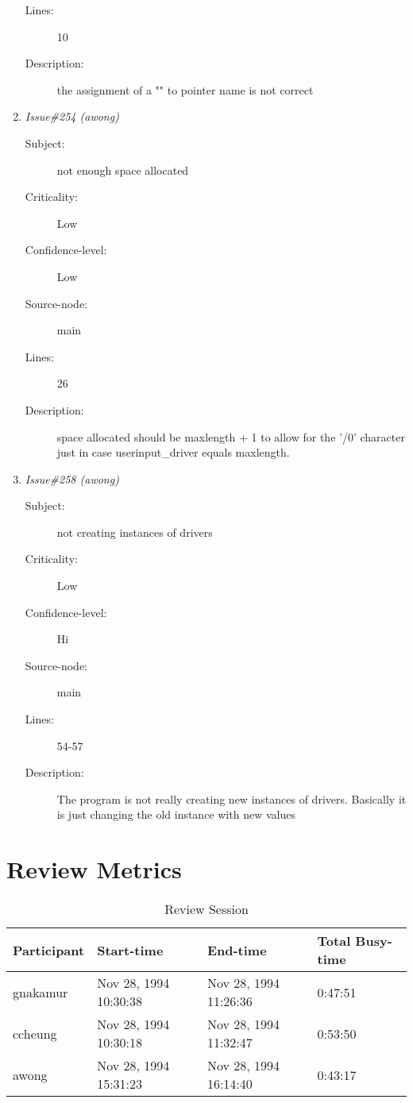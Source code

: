 \begin{enumerate}
\begin{description}
\item [Lines:] 10

\item [Description:] the assignment of a "" to pointer name is not correct
\end{description}
\item {\it Issue\#254 (awong)}
\begin{description}
\item [Subject:] not enough space allocated
\item [Criticality:] Low
\item [Confidence-level:] Low
\item [Source-node:] main

\item [Lines:] 26

\item [Description:] space allocated should be maxlength + 1 to allow for the '/0' 
character just in case userinput\_driver equals maxlength.
\end{description}
\item {\it Issue\#258 (awong)}
\begin{description}
\item [Subject:] not creating instances of drivers
\item [Criticality:] Low
\item [Confidence-level:] Hi
\item [Source-node:] main

\item [Lines:] 54-57

\item [Description:] The program is not really creating new instances of drivers. 
Basically it is just changing the old instance with new values
\end{description}
\end{enumerate}
\section{Review Metrics}
\begin{table}[hb]
\begin{center}
\begin{tabular}{|l|l|l|l|}
\hline
Participant & Start-time & End-time & Total Busy-time \\
\hline
gnakamur & Nov 28, 1994 10:30:38 & Nov 28, 1994 11:26:36 & 0:47:51 \\
ccheung & Nov 28, 1994 10:30:18 & Nov 28, 1994 11:32:47 & 0:53:50 \\
awong & Nov 28, 1994 15:31:23 & Nov 28, 1994 16:14:40 & 0:43:17 \\
\hline
\end{tabular}
\end{center}
\caption{Review Session}
\end{table}


